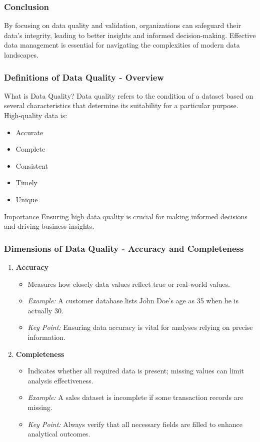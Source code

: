 \documentclass[aspectratio=169]{beamer}
\begin{document}
\begin{frame}[fragile]
    \frametitle{Conclusion}
    By focusing on data quality and validation, organizations can safeguard their data's integrity, leading to better insights and informed decision-making. Effective data management is essential for navigating the complexities of modern data landscapes.
\end{frame}

\begin{frame}[fragile]
    \frametitle{Definitions of Data Quality - Overview}
    \begin{block}{What is Data Quality?}
        Data quality refers to the condition of a dataset based on several characteristics that determine its suitability for a particular purpose. 
        High-quality data is:
        \begin{itemize}
            \item Accurate
            \item Complete
            \item Consistent
            \item Timely
            \item Unique
        \end{itemize}
    \end{block}
    \begin{block}{Importance}
        Ensuring high data quality is crucial for making informed decisions and driving business insights.
    \end{block}
\end{frame}

\begin{frame}[fragile]
    \frametitle{Dimensions of Data Quality - Accuracy and Completeness}
    \begin{enumerate}
        \item \textbf{Accuracy}
        \begin{itemize}
            \item Measures how closely data values reflect true or real-world values.
            \item \textit{Example:} A customer database lists John Doe's age as 35 when he is actually 30.
            \item \textit{Key Point:} Ensuring data accuracy is vital for analyses relying on precise information.
        \end{itemize}
        
        \item \textbf{Completeness}
        \begin{itemize}
            \item Indicates whether all required data is present; missing values can limit analysis effectiveness.
            \item \textit{Example:} A sales dataset is incomplete if some transaction records are missing.
            \item \textit{Key Point:} Always verify that all necessary fields are filled to enhance analytical outcomes.
        \end{itemize}
    \end{enumerate}
\end{frame}
\end{document}
